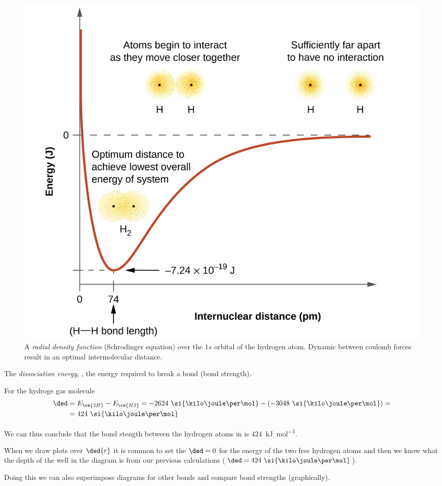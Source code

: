 \documentclass[../mit-general-chemistry.tex]{subfiles}
\begin{document}
\begin{figure}[t]
  \begin{margincap}
    \begin{center}
      \includegraphics[width=.85\textwidth]{internucleardistance}
    \end{center}
    \caption{
      A {\em radial density function} (Schrodinger equation) over the
      $1s$ orbital of the hydrogen atom. Dynamic between coulomb
      forces result in an optimal intermolecular distance.
    }
  \end{margincap}
\end{figure}

The {\em dissociation energy}, \ded, the energy required to
break a bond (bond strength).

For the hydroge gas molecule
\begin{align*}
  \ded &= E_{\ce{2H}} - E_{\ce{H2}} =
  -2624~\si{\kilo\joule\per\mol} - (-3048~\si{\kilo\joule\per\mol}) =\\
  &= 424~\si{\kilo\joule\per\mol} \\
\end{align*}

We can thus conclude that the bond stength between the hydrogen atoms
in  is 424~\si{\kilo\joule\per\mol}.



When we draw plots over $\ded{r}$ it is common to  set the $\ded = 0$
for the energy of the two free hydrogen atoms and then we know what
the depth of the well in the diagram is from our previous
calculations ($\ded = 424~\si{\kilo\joule\per\mol}$).

Doing this we can also superimpose diagrams for other bonds and
compare bond strengths (graphically).
\end{document}
